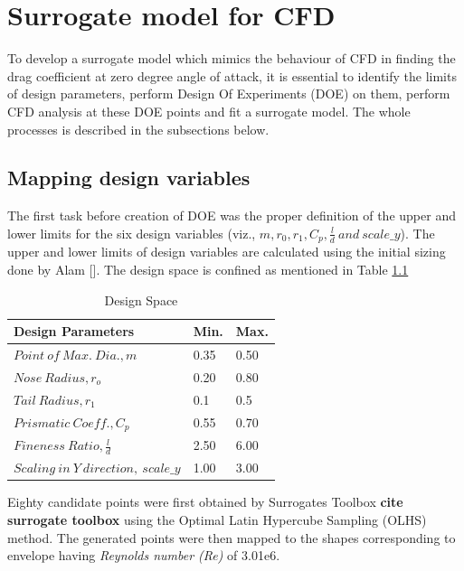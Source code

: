 \chapter{Surrogate model for CFD}
\label{Surrogate model for CFD}
To develop a surrogate model which mimics the behaviour of CFD in finding the drag coefficient at zero degree angle of attack, it is essential to identify the limits of design parameters, perform Design Of Experiments (DOE) on them, perform CFD analysis at these DOE points and fit a surrogate model. The whole processes is described in the subsections below.

\section{Mapping design variables}
The first task before creation of DOE was the proper definition of the upper and lower limits for the six design variables (viz., $ m, r_0, r_1, C_p, \frac{l}{d} \ and \  scale \_y $). The upper and lower limits of design variables are calculated using the initial sizing done by Alam []. The design space is confined as mentioned in Table \ref{Degign space }

\begin{table}[H]
	\centering
	\caption{Design Space}
	\label{Degign space }
	\begin{tabular}{lll}
		\hline \hline
		Design Parameters & Min. & Max.    \\ \hline \hline
		
		$ Point\ of\ Max.\ Dia., m$ & 0.35 & 0.50     \\  
		$ Nose\ Radius, r _{o} $ & 0.20 & 0.80     \\
		$ Tail\ Radius, r _{1} $ & 0.1 & 0.5     \\  
		$ Prismatic\ Coeff., C _{p }$ & 0.55 & 0.70 \\
		$ Fineness\ Ratio, \frac{l}{d} $ &2.50 & 6.00 \\
		$Scaling\ in\ Y\ direction,\ scale\_y$ &1.00 & 3.00\\ \hline \hline
	\end{tabular}
\end{table}

Eighty candidate points were first obtained by Surrogates Toolbox \textbf{cite surrogate toolbox} using the Optimal Latin Hypercube Sampling (OLHS) method. The generated points were then mapped to the shapes corresponding to envelope having \textit{Reynolds number (Re)} of 3.01e6.

